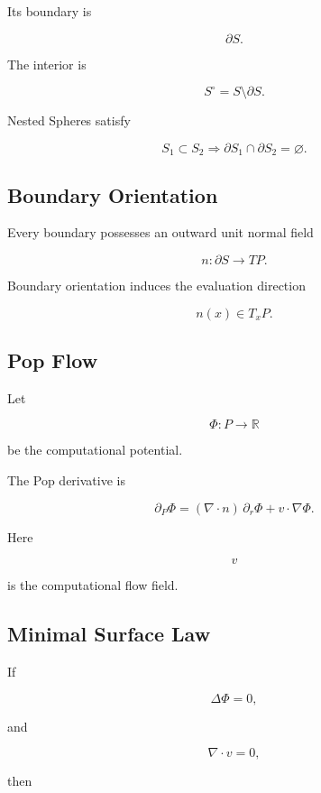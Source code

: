 \documentclass[12pt,oneside]{article}
\theoremstyle{definition}
\theoremstyle{remark}
\begin{document}
Its boundary is

\[
\partial S.
\]

The interior is

\[
S^\circ
=
S
\setminus
\partial S.
\]

Nested Spheres satisfy

\[
S_1
\subset
S_2
\Longrightarrow
\partial S_1
\cap
\partial S_2
=
\varnothing.
\]

\subsection*{Boundary Orientation}

Every boundary possesses an outward unit normal field

\[
n
:
\partial S
\rightarrow
TP.
\]

Boundary orientation induces the evaluation direction

\[
n(x)
\in
T_xP.
\]

\subsection*{Pop Flow}

Let

\[
\Phi
:
P
\rightarrow
\mathbb R
\]

be the computational potential.

The Pop derivative is

\[
\partial_P\Phi
=
(\nabla\cdot n)\,
\partial_r\Phi
+
v\cdot\nabla\Phi.
\]

Here

\[
v
\]

is the computational flow field.

\subsection*{Minimal Surface Law}

If

\[
\Delta\Phi
=
0,
\]

and

\[
\nabla\cdot v
=
0,
\]

then
\end{document}
